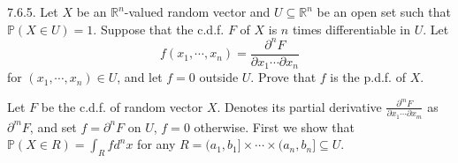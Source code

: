 \begin{exercise}7.6.5.
Let $X$ be an $\mathbb{R}^n$-valued random vector and $U\subseteq \mathbb{R}^n$ be an
open set such that $\mathbb{P}(X \in U) = 1$. Suppose that the c.d.f. $F$ of $X$ is $n$ times
differentiable in $U$. Let
\begin{equation*}
    f(x_1,\cdots,x_n)=\frac{\partial^n F}{\partial x_1\cdots\partial x_n}
\end{equation*}
for $(x_1,\cdots, x_n)\in U$, and let $f = 0$ outside $U$. Prove that $f$ is the p.d.f. of $X$.
\end{exercise}
\begin{answer}
Let $F$ be the c.d.f. of random vector $X$. Denotes its partial derivative $\frac{\partial^m F}{\partial x_1\cdots\partial x_m}$ as $\partial^m F$, and set $f = \partial^nF$ on $U$, $f=0$ otherwise. First we show that $\mathbb{P}(X\in R)=\int_Rfd^nx$ for any $R=(a_1,b_1]\times\cdots\times(a_n,b_n]\subseteq U$.


\end{answer}
